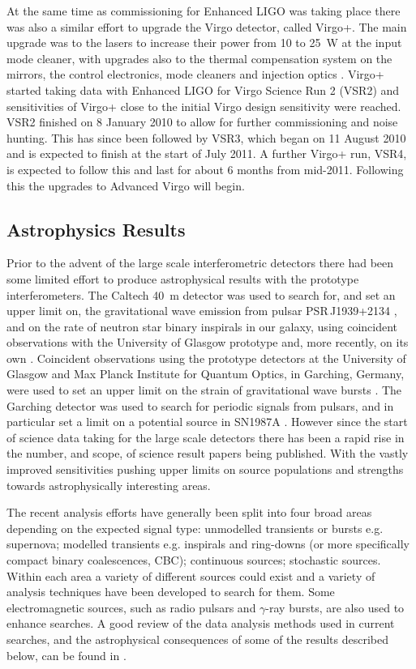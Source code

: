 \documentclass{article}
\begin{document}
At the same time as commissioning for Enhanced LIGO was taking place there
was also a similar effort to upgrade the Virgo detector, called Virgo+.
The main upgrade was to the lasers to increase their power from 10 to 25~W at
the input mode cleaner, with upgrades also to the thermal compensation system
on the mirrors, the control electronics, mode cleaners and injection optics
\cite{Acernese:2008b, AdVwhitepaper}. Virgo+ started taking data with
Enhanced LIGO for Virgo Science Run 2 (VSR2) and sensitivities of Virgo+ close to
the initial Virgo design sensitivity were reached. VSR2 finished on 8 January 2010
to allow for further commissioning and noise hunting. This has since been followed
by VSR3, which began on 11 August 2010 and is expected to finish at the start of
July 2011. A further Virgo+ run, VSR4, is expected to follow this and last for
about 6 months from mid-2011. Following this the upgrades to Advanced Virgo will begin.

\subsection{Astrophysics Results}\label{subsection:results}
Prior to the advent of the large scale interferometric detectors there had
been some limited effort to produce astrophysical results with the prototype
interferometers. The Caltech 40~m detector was used to search for, and set an
upper limit on, the gravitational wave emission from pulsar PSR\,J1939+2134
\cite{Hereld:1984}, and on the rate of neutron star binary
inspirals in our galaxy, using coincident observations with the University of
Glasgow prototype \cite{Smith:1988} and, more recently, on its own
\cite{Allen:1999}. Coincident observations using the prototype detectors at the
University of Glasgow and Max Planck Institute for Quantum Optics, in Garching,
Germany, were used to set an upper limit on the strain of gravitational wave
bursts \cite{Nicholson:1996}. The Garching detector was used to search for
periodic signals from pulsars, and in particular set a limit on a potential
source in SN1987A \cite{Niebauer:1993}. However since the start of science data
taking for the large scale detectors there has been a rapid rise in the number,
and scope, of science result papers being published. With the vastly improved
sensitivities pushing upper limits on source populations and strengths towards
astrophysically interesting areas.

The recent analysis efforts have generally been split into four broad areas
depending on the expected signal type: unmodelled transients or bursts e.g. supernova;
modelled transients e.g. inspirals and ring-downs (or more specifically compact
binary coalescences, CBC); continuous sources;
stochastic sources. Within each area a variety of different sources could
exist and a variety of analysis techniques have been developed to search for
them. Some electromagnetic sources, such as radio pulsars and $\gamma$-ray
bursts, are also used to enhance searches. A good review of the data analysis 
methods used in current searches, and the astrophysical consequences of some of
the results described below, can be found in \cite{Sathyaprakash:2009}.
\end{document}
